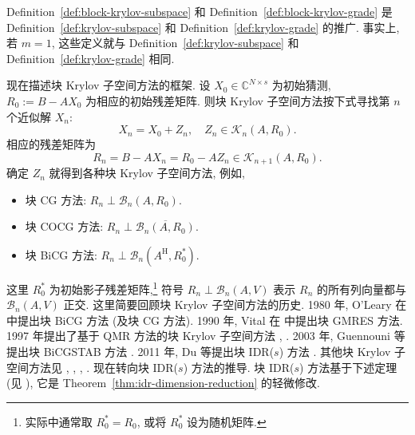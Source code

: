 \par{}
\begin{Remark}\label{rem:block-grade-scalar-reduction}
{Definition\ \ref{def:block-krylov-subspace} 和 Definition\ \ref{def:block-krylov-grade} 是 Definition\ \ref{def:krylov-subspace} 和 Definition\ \ref{def:krylov-grade} 的推广. 事实上, 若 $m=1$, 这些定义就与 Definition\ \ref{def:krylov-subspace} 和 Definition\ \ref{def:krylov-grade} 相同.}
\end{Remark}
{现在描述块 Krylov 子空间方法的框架. 设 $X_0\in\mathbb C^{N\times s}$ 为初始猜测, $R_0:=B-AX_0$ 为相应的初始残差矩阵. 则块 Krylov 子空间方法按下式寻找第 $n$ 个近似解 $X_n$:}
\[X_n=X_0+Z_n,\quad Z_n\in\mathcal K_n(A,R_0).\]
{相应的残差矩阵为}
\[R_n=B-AX_n=R_0-AZ_n\in\mathcal K_{n+1}(A,R_0).\]
{确定 $Z_n$ 就得到各种块 Krylov 子空间方法, 例如,}
\begin{itemize}
\item{块 CG 方法:} $R_n\perp\mathcal B_n(A,R_0)$.
\item{块 COCG 方法:} $R_n\perp\overline{\mathcal B_n(A,R_0)}$.
\item{块 BiCG 方法:} $R_n\perp\mathcal B_n(A^{\mathrm H},R_0^{*})$.
\end{itemize}
{这里 $R_0^{*}$ 为初始影子残差矩阵,}\footnote{{实际中通常取 $R_0^{*}=R_0$, 或将 $R_0^{*}$ 设为随机矩阵.}}
{符号 $R_n\perp\mathcal B_n(A,V)$ 表示 $R_n$ 的所有列向量都与 $\mathcal B_n(A,V)$ 正交.}
{\leavevmode{}\label{idx:chapter-03-section-03:block-krylov-history}这里简要回顾块 Krylov 子空间方法的历史. 1980 年, O’Leary 在  中提出块 BiCG 方法 (及块 CG 方法). 1990 年, Vital 在  中提出块 GMRES 方法. 1997 年提出了基于 QMR 方法的块 Krylov 子空间方法 , . 2003 年, Guennouni 等提出块 BiCGSTAB 方法 . 2011 年, Du 等提出块 IDR($s$) 方法 . 其他块 Krylov 子空间方法见 , , , .}
{现在转向块 IDR($s$) 方法的推导. 块 IDR($s$) 方法基于下述定理 (见 ), 它是 Theorem\ \ref{thm:idr-dimension-reduction} 的轻微修改.}
\par{}
